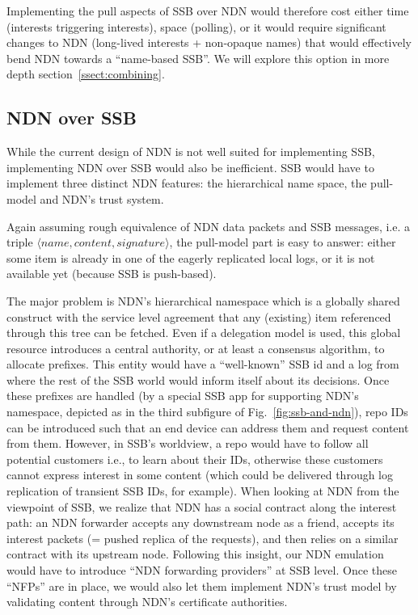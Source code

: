 \documentclass[9pt,sigconf]{acmart}
\begin{document}
Implementing the pull aspects of SSB over NDN would therefore cost
either time (interests triggering interests), space (polling), or it
would require significant changes to NDN (long-lived interests +
non-opaque names) that would effectively bend NDN towards a
``name-based SSB''. We will explore this option in more depth
section~\ref{ssect:combining}.


\subsection{NDN over SSB}
\label{ssect:ndn-over-ssb}

While the current design of NDN is not well suited for implementing
SSB, implementing NDN over SSB would also be inefficient. SSB would
have to implement three distinct NDN features: the hierarchical name
space, the pull-model and NDN's trust system.

Again assuming rough equivalence of NDN data packets and SSB messages,
i.e. a triple $\langle name,content,signature\rangle$, the pull-model
part is easy to answer: either some item is already in one of the
eagerly replicated local logs, or it is not available yet (because SSB
is push-based).

The major problem is NDN's hierarchical namespace which is a globally
shared construct with the service level agreement that any (existing)
item referenced through this tree can be fetched.  Even if a
delegation model is used, this global resource introduces a central
authority, or at least a consensus algorithm, to allocate
prefixes. This entity would have a ``well-known'' SSB id and a log
from where the rest of the SSB world would inform itself about its
decisions. Once these prefixes are handled (by a special SSB app for
supporting NDN's namespace, depicted as  in the
third subfigure of Fig.~\ref{fig:ssb-and-ndn}), repo IDs can be
introduced such that an end device can address them and request
content from them. However, in SSB's worldview, a repo would have to
follow all potential customers i.e., to learn about their IDs,
otherwise these customers cannot express interest in some content
(which could be delivered through log replication of transient SSB
IDs, for example). When looking at NDN from the viewpoint of SSB, we
realize that NDN has a social contract along the interest path: an NDN
forwarder accepts any downstream node as a friend, accepts its
interest packets (= pushed replica of the requests), and then relies
on a similar contract with its upstream node. Following this insight,
our NDN emulation would have to introduce ``NDN forwarding providers''
at SSB level. Once these ``NFPs'' are in place, we would also let them
implement NDN's trust model by validating content through NDN's
certificate authorities.
\end{document}
